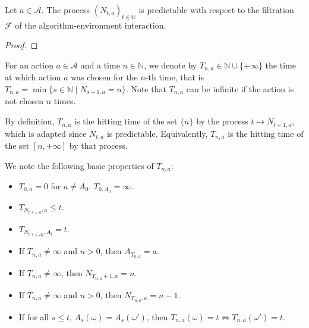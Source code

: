 \begin{lemma}\label{lem:predictable_pullCount}
  \leanok
Let $a \in \mathcal{A}$. The process $(N_{t,a})_{t \in \mathbb{N}}$ is predictable with respect to the filtration $\mathcal{F}$ of the algorithm-environment interaction.
\end{lemma}

\begin{proof}\leanok

\end{proof}


\begin{definition}\label{def:stepsUntil}
  \leanok
For an action $a \in \mathcal{A}$ and a time $n \in \mathbb{N}$, we denote by $T_{n,a} \in \mathbb{N} \cup \{+\infty\}$ the time at which action $a$ was chosen for the $n$-th time, that is $T_{n,a} = \min\{s \in \mathbb{N} \mid N_{s+1,a} = n\}$.
Note that $T_{n, a}$ can be infinite if the action is not chosen $n$ times.
\end{definition}

By definition, $T_{n, a}$ is the hitting time of the set $\{n\}$ by the process $t \mapsto N_{t+1,a}$, which is adapted since $N_{t,a}$ is predictable.
Equivalently, $T_{n, a}$ is the hitting time of the set $[n, +\infty]$ by that process.


\begin{lemma}\label{lem:stepsUntil_basic}
  \leanok
We note the following basic properties of $T_{n,a}$:
\begin{itemize}
  \item $T_{0,a} = 0$ for $a \ne A_0$. $T_{0,A_0} = \infty$.
  \item $T_{N_{t+1, a}, a} \le t$.
  \item $T_{N_{t + 1, A_t}, A_t} = t$.
  \item If $T_{n, a} \ne \infty$ and $n > 0$, then $A_{T_{n, a}} = a$.
  \item If $T_{n, a} \ne \infty$, then $N_{T_{n, a} + 1, a} = n$.
  \item If $T_{n, a} \ne \infty$ and $n > 0$, then $N_{T_{n, a}, a} = n - 1$.
  \item If for all $s \le t$, $A_s(\omega) = A_s(\omega')$, then $T_{n, a}(\omega) = t \iff T_{n, a}(\omega') = t$.
\end{itemize}
\end{lemma}

